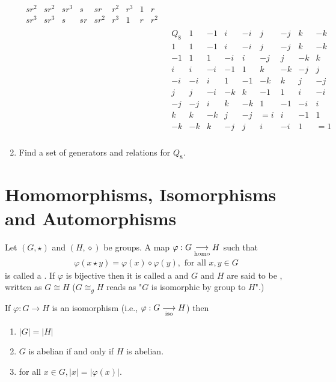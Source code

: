 \documentclass[10pt,a4paper]{report}
\begin{document}
\begin{enumerate}
{\begin{align*}
\begin{array}{c|cccccccc}
			sr^2 &sr^2 & sr^3   & s   & sr   & r^2 & r^3  & 1   & r\\
			sr^3 &sr^3 & s      & sr  & sr^2 & r^3 & 1    & r  &r^2
		\end{array}\\
		&\begin{array}{c|ccccccccc}
		Q_8 &  1 & -1 & i & -i & j & -j &  k & -k \\
		\hline
		1  & 1 & -1 &  i & -i &  j & -j &  k & -k \\
		-1 & 1 &  1 & -i &  i & -j &  j & -k & k\\
		i  & i & -i & -1 &  1 &  k & -k & -j & j\\
		-i & -i&  i &  1 & -1 & -k &  k &  j & -j\\
		j  & j & -i & -k &  k & -1 &  1 &  i & -i\\
		-j & -j&  i &  k & -k & 1 &  -1 & -i & i\\
		k  & k & -k &  j & -j & =i &  i & -1 & 1\\
		-k & -k&  k & -j &  j &  i & -i &  1 & =1\\	
		\end{array}
	\end{align*}
	}
	
	\item Find a set of generators and relations for $Q_8$.
\end{enumerate}

\section{Homomorphisms, Isomorphisms and Automorphisms}

\begin{definition}[Homomorphisms] Let $(G, \star)$ and $(H, \diamond)$ be groups.  A map $\varphi : G\underset{\text{homo}}\longrightarrow H$ such that 
\begin{align*}
	\varphi(x\star y)=\varphi(x)\diamond\varphi(y), \text{ for all } x,y \in G
\end{align*}is called a .  If $\varphi$ is bijective then it is called a  and $G$ and $H$ are said to be , written as $G \cong H$ ($G \cong_g H$ reads as "$G$ is isomorphic by group to $H$".)
\end{definition}

\begin{remark} If $\varphi: G \to H$ is an isomorphism (i.e., $\varphi: G \underset{\text{iso}}\longrightarrow H$) then
\begin{enumerate}
	\item $|G| = |H|$
	
	\item $G$ is abelian if and only if $H$ is abelian.
	
	\item for all $x \in G, |x|=|\varphi(x)|.$
\end{enumerate}
\end{remark}
\end{document}

